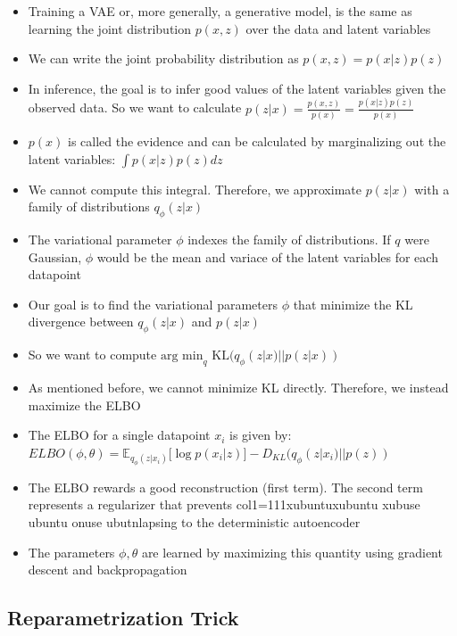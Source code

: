 \documentclass[]{article}
\begin{document}
\begin{itemize}
    \item Training a VAE or, more generally, a generative model, is the same as learning the joint distribution $p(x,z)$ over the data and latent variables
    \item We can write the joint probability distribution as $p(x,z) = p(x|z) p(z)$  
    \item In inference, the goal is to infer good values of the latent variables given the observed data. So we want to calculate $p(z|x) = \frac{p(x,z)}{p(x)} = \frac{p(x|z)p(z)}{p(x)}$ 
    \item $p(x)$ is called the evidence and can be calculated by marginalizing out the latent variables: $\int p(x|z) p(z) dz$
    \item We cannot compute this integral. Therefore, we approximate $p(z|x)$ with a family of distributions $q_{\phi}(z|x)$
    \item The variational parameter $\phi$ indexes the family of distributions. If $q$ were Gaussian, $\phi$ would be the mean and variace of the latent variables for each datapoint
    \item Our goal is to find the variational parameters $\phi$ that minimize the KL divergence between $q_{\phi}(z|x)$ and $p(z|x)$
    \item So we want to compute $\text{arg min}_q \text{ KL}(q_{\phi}(z|x)|| p(z|x))$
    \item As mentioned before, we cannot minimize KL directly. Therefore, we instead maximize the ELBO 
    \item The ELBO for a single datapoint $x_i$ is given by: \\ $ELBO(\phi, \theta) = \mathbb{E}_{q_{\phi}(z|x_i)} \big[\log p(x_i|z)\big] - D_{KL}(q_{\phi}(z|x_i)||p(z))$
    \item The ELBO rewards a good reconstruction (first term). The second term represents a regularizer that prevents col1=111xubuntuxubuntu
    xubuse ubuntu onuse ubutnlapsing to the deterministic autoencoder 
        
    \item The parameters $\phi, \theta$ are learned by maximizing this quantity using gradient descent and backpropagation
\end{itemize}

\subsection{Reparametrization Trick}
\label{sec:reparametrization_trick}
\end{document}
